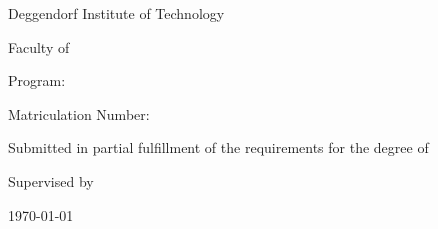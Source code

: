 \thispagestyle{empty}

\begin{titlepage}
    \centering
    \vspace*{1cm}
    {\Large Deggendorf Institute of Technology \par}
    \vspace{1cm}
    {\large Faculty of \faculty \par} %
    {\large Program: \studies \par} %
    \vspace{2cm}
    {\Huge\bfseries \thesistitleEN \par}
    \vspace{2cm}
    {\Large\itshape \student \par}
    \vspace{0.2cm}
    Matriculation Number: \matrnr \par
    \vfill
    Submitted in partial fulfillment of the requirements for the degree of \par
    \textbf{\degree}
    
    \vfill
    
    Supervised by \par
    \supervisor

    \vfill

    {\large \today\par}
\end{titlepage}
